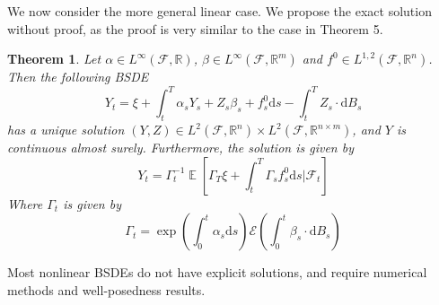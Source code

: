 \documentclass{amsart}
\newcommand{\rr}{\mathbb R}    %
\newcommand{\cF}{\mathcal{F}}
\newcommand{\cE}{\mathcal{E}}
\DeclareMathOperator{\ee}{\mathbb E}
\newtheorem{theorem}{Theorem}
\theoremstyle{definition}
\theoremstyle{remark}
\numberwithin{equation}{section}
\begin{document}
We now consider the more general linear case. We propose the exact solution without proof, as the proof is very similar to the case in Theorem 5. 
\begin{theorem}
    Let $\alpha \in L^\infty (\cF, \rr)$, $\beta \in L^\infty(\cF, \rr^{m})$ and $f^0 \in L^{1,2}(\cF, \rr^n)$. Then the following BSDE
    \begin{equation}
        Y_t = \xi + \int_t^T \alpha_s Y_s + Z_s \beta_s + f_s^0 \mathrm{d} s - \int_t^T Z_s \cdot \mathrm{d}B_s
    \end{equation}
    has a unique solution $(Y, Z) \in L^2(\cF, \rr^n) \times L^2(\cF, \rr^{n \times m})$, and $Y$ is continuous almost surely. Furthermore, the solution is given by
    \begin{equation}
        Y_t = \Gamma_t^{-1} \ee \left[
            \Gamma_T \xi + \int_t^T \Gamma_s f_s^0 \mathrm{d} s \bigg| \cF_t
        \right]
    \end{equation}
    Where $\Gamma_t$ is given by
    \[
    \Gamma_t = \exp\left(\int_0^t \alpha_s \mathrm{d} s\right) \cE\left(
        \int_0^t \beta_s \cdot \mathrm{d} B_s
    \right)
    \]
\end{theorem}
Most nonlinear BSDEs do not have explicit solutions, and require numerical methods and well-posedness results. 
\end{document}
